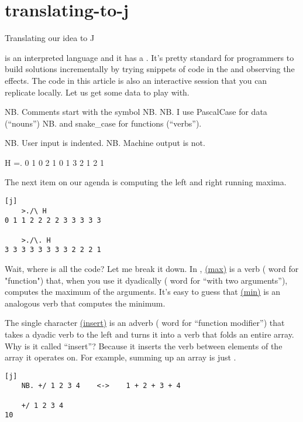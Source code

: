 \documentclass{article}
\begin{document}
\section{translating-to-j}{Translating our idea to J}

 is an interpreted language and it has a \href{https://en.wikipedia.org/wiki/Read%E2%80%93eval%E2%80%93print_loop}{\sc{repl}}.
It's pretty standard for  programmers to build solutions incrementally by trying snippets of code in the  and observing the effects.
The code in this article is also an interactive  session that you can replicate locally.
Let us get some data to play with.

\begin{code}[j]
    NB. Comments start with the symbol NB.
    NB. I use PascalCase for data (“nouns”)
    NB. and snake_case for functions (“verbs”).

    NB. User input is indented.
NB. Machine output is not.

    H =. 0 1 0 2 1 0 1 3 2 1 2 1
\end{code}

The next item on our agenda is computing the left and right running maxima.

\begin{verbatim}[j]
    >./\ H
0 1 1 2 2 2 2 3 3 3 3 3

    >./\. H
3 3 3 3 3 3 3 3 2 2 2 1
\end{verbatim}

Wait, where is all the code?
Let me break it down.
In , \href{https://code.jsoftware.com/wiki/Vocabulary/gtdot#dyadic}{ (max)} is a verb ( word for "function") that, when you use it dyadically ( word for ``with two arguments''), computes the maximum of the arguments.
It's easy to guess that \href{https://code.jsoftware.com/wiki/Vocabulary/ltdot#dyadic}{ (min)} is an analogous verb that computes the minimum.

The single character \href{https://code.jsoftware.com/wiki/Vocabulary/slash}{\code{/} (insert)} is an adverb ( word for ``function modifier'') that takes a dyadic verb to the left and turns it into a verb that folds an entire array.
Why is it called ``insert''?
Because it inserts the verb between elements of the array it operates on.
For example, summing up an array is just \code{+/}.

\begin{verbatim}[j]
    NB. +/ 1 2 3 4    <->    1 + 2 + 3 + 4

    +/ 1 2 3 4
10
\end{verbatim}
\end{document}
